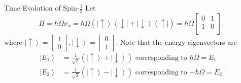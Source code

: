 \documentclass[phys334]{subfiles}
\begin{document}
    \begin{example}{Time Evolution of Spin-$\frac{1}{2}$}
        Let
        \begin{equation*}
            H = \hbar\Omega\sigma_x = \hbar\Omega \left( \left| \uparrow \right\rangle \left\langle \downarrow \right| + \left| \downarrow \right\rangle \left\langle \uparrow \right| \right) = \hbar\Omega
            \begin{bmatrix}
            	0 & 1 \\
            	1 & 0 \\
            \end{bmatrix},
        \end{equation*}
        where $\left| \uparrow \right\rangle = \begin{bmatrix} 1 \\ 0 \end{bmatrix} , \left| \downarrow \right\rangle = \begin{bmatrix} 0\\1 \end{bmatrix}$. Note that the energy eigenvectors are
        \begin{equation*}
            \begin{aligned}
                \left| E_1 \right\rangle & = \frac{1}{\sqrt{2}} \left( \left| \uparrow \right\rangle + \left| \downarrow \right\rangle \right) \text{ corresponding to $\hbar\Omega=E_1$} \\
                \left| E_2 \right\rangle & = \frac{1}{\sqrt{2}} \left( \left| \uparrow \right\rangle - \left| \downarrow \right\rangle \right) \text{ corresponding to $-\hbar\Omega=E_2$}
            \end{aligned} .
        \end{equation*}


\end{example}
\end{document}
